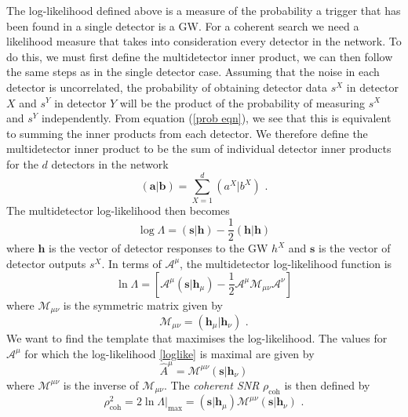 \documentclass[11pt]{cuthesis}
\newcommand{\mn}{_{\mu\nu}}
\newcommand{\fs}{\text{ .}}
\begin{document}
The log-likelihood defined above is a measure of the probability a trigger that has been found in a single detector is a GW. For a coherent search we need a likelihood measure that takes into consideration every detector in the network. To do this, we must first define the multidetector inner product, we can then follow the same steps as in the single detector case. Assuming that the noise in each detector is uncorrelated, the probability of obtaining detector data $s^X$ in detector $X$ and $s^Y$ in detector $Y$ will be the product of the probability of measuring $s^X$ and $s^Y$ independently. From equation (\ref{prob eqn}), we see that this is equivalent to summing the inner products from each detector. We therefore define the multidetector inner product to be the sum of individual detector inner products for the $d$ detectors in the network
\begin{equation}
(\textbf{a}|\textbf{b}) = \sum_{X=1}^d (a^X|b^X) \textbf{ .}
\end{equation}
The multidetector log-likelihood then becomes
\begin{equation}
\log \Lambda = (\textbf{s}|\textbf{h}) - \frac{1}{2}(\textbf{h}|\textbf{h}) \end{equation}
where $\textbf{h}$ is the vector of detector responses to the GW $h^X$ and $\textbf{s}$ is the vector of detector outputs $s^X$.
In terms of $\mathcal{A}^\mu$, the multidetector log-likelihood function is
\begin{equation} \label{loglike}
\ln \Lambda = \left[ \mathcal{A}^\mu(\textbf{s}|\textbf{h}_\mu) - \frac{1}{2}\mathcal{A}^\mu \mathcal{M}_{\mu\nu}\mathcal{A}^\nu \right]
\end{equation}
where $\mathcal{M}\mn$ is the symmetric matrix given by
\begin{equation}
\mathcal{M}_{\mu\nu} = (\textbf{h}_\mu|\textbf{h}_\nu) \fs
\end{equation}
We want to find the template that maximises the log-likelihood. The values for $\mathcal{A}^\mu$ for which the log-likelihood \ref{loglike} is maximal are given by
\begin{equation}
\hat{A}^\mu =\mathcal{M}^{\mu\nu}(\textbf{s}|\textbf{h}_\nu)
\end{equation}
where $\mathcal{M}^{\mu\nu}$ is the inverse of $\mathcal{M}_{\mu\nu}$. The \textit{coherent SNR} $\rho_\text{coh}$ is then defined by
\begin{equation} \label{rhocoh1}
\rho^2_\text{coh} = 2\ln \Lambda |_\text{max} = (\textbf{s}|\textbf{h}_\mu)\mathcal{M}^{\mu\nu}(\textbf{s}|\textbf{h}_\nu) \fs
\end{equation}
\end{document}

